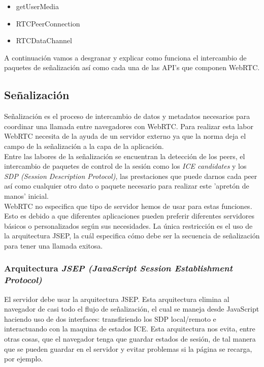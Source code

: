 \begin{itemize}
\item getUserMedia
\item RTCPeerConnection
\item RTCDataChannel
\end{itemize}

A continuación vamos a desgranar y explicar como funciona el intercambio de paquetes de señalización así como cada una de las API's que componen WebRTC.

\subsection{Señalización} 

Señalización es el proceso de intercambio de datos y metadatos necesarios para coordinar una llamada entre navegadores con WebRTC. Para realizar esta labor WebRTC necesita de la ayuda de un servidor externo ya que la norma deja el campo de la señalización a la capa de la aplicación.\\

Entre las labores de la señalización se encuentran la detección de los peers, el intercambio de paquetes de control de la sesión como los \textit{ICE candidates} y los \textit{SDP (Session Description Protocol)}, las prestaciones que puede darnos cada peer así como cualquier otro dato o paquete necesario para realizar este 'apretón de manos' inicial.\\

WebRTC no especifica que tipo de servidor hemos de usar para estas funciones. Esto es debido a que diferentes aplicaciones pueden preferir diferentes servidores básicos o personalizados según sus necesidades. La única restricción es el uso de la arquitectura JSEP, la cuál especifica cómo debe ser la secuencia de señalización para tener una llamada exitosa.

\subsubsection{Arquitectura \textit{JSEP (JavaScript Session Establishment Protocol)}}

El servidor debe usar la arquitectura JSEP. Esta arquitectura elimina al navegador de casi todo el flujo de señalización, el cual se maneja desde JavaScript haciendo uso de dos interfaces: transfiriendo los SDP local/remoto e interactuando con la maquina de estados ICE. Esta arquitectura nos evita, entre otras cosas, que el navegador tenga que guardar estados de sesión, de tal manera que se pueden guardar en el servidor y evitar problemas si la página se recarga, por ejemplo. \\

